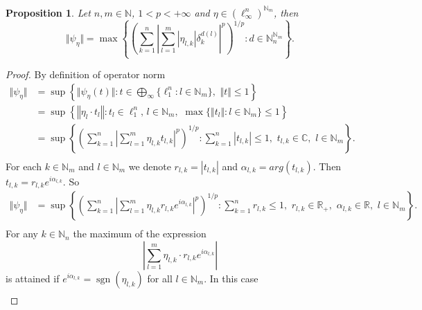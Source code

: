 \documentclass[12pt]{article}
\newtheorem{proposition}[theorem]{Proposition}
\begin{document}
\begin{proposition}\label{ExtMorphNorm}
    Let $n,m\in\mathbb{N}$, $1<p<+\infty$ 
    and $\eta\in(\ell_{\infty}^n)^{\mathbb{N}_m}$, then 
    \[
        \Vert \psi_{\eta}\Vert=\max\left\{
            \left(\sum_{k=1}^n
                \left|\sum_{l=1}^m |\eta_{l,k}| \delta_{k}^{d(l)}\right|^p
            \right)^{1/p} : 
            d\in\mathbb{N}_n^{\mathbb{N}_m}
        \right\}.
    \]
\end{proposition}
\begin{proof}
    By definition of operator norm
    \[
    \begin{aligned}
        \Vert\psi_{\eta}\Vert
        &=\sup\left\{
            \Vert\psi_{\eta}(t)\Vert:
            t\in \bigoplus_{\infty}\{\ell_1^n:l\in\mathbb{N}_m\},\,\,
            \Vert t\Vert\leq 1
        \right\} \\
        &=\sup\left\{
            \left\Vert\eta_{l}\cdot t_l\right\Vert:
            t_l\in\ell_1^n,\, l\in\mathbb{N}_m,\,\,
            \max\{\Vert t_l\Vert:l\in\mathbb{N}_m\}\leq 1
        \right\} \\
        &=\sup\left\{
            \left(\sum_{k=1}^n
                \left|\sum_{l=1}^{m}\eta_{l,k} t_{l,k}\right|^p
            \right)^{1/p}:
            \sum_{k=1}^n |t_{l,k}|\leq 1,\,\, 
            t_{l,k}\in\mathbb{C},\,\, l\in\mathbb{N}_m
        \right\}. \\
    \end{aligned}
    \]
    For each $k\in\mathbb{N}_m$ and $l\in\mathbb{N}_m$ we 
    denote $r_{l,k}=|t_{l,k}|$ and $\alpha_{l,k}=arg(t_{l,k})$. 
    Then $t_{l,k}=r_{l,k} e^{i \alpha_{l,k}}$. So
    \[
    \begin{aligned}
        \Vert \psi_{\eta}\Vert
        &=\sup\left\{
            \left(\sum_{k=1}^n
                \left|
                    \sum_{l=1}^{m}\eta_{l,k} r_{l,k} e^{i \alpha_{l,k}}
                \right|^p
            \right)^{1/p}:
            \sum_{k=1}^n r_{l,k}\leq 1,\,\, 
            r_{l,k}\in\mathbb{R}_+,\,\, 
            \alpha_{l,k}\in\mathbb{R},\,\, 
            l\in\mathbb{N}_m
        \right\}. \\
    \end{aligned}
    \]
    For any $k\in\mathbb{N}_n$ the maximum of the expression 
    \[
        \left|\sum_{l=1}^{m}\eta_{l,k}\cdot r_{l,k} e^{i \alpha_{l,k}}\right|
    \]
    is attained if $e^{i \alpha_{l,k}}=\operatorname{sgn}(\eta_{l,k})$ for 
    all $l\in\mathbb{N}_m$. In this case
    \[
    \begin{aligned}

\end{aligned}\]
\end{proof}
\end{document}
